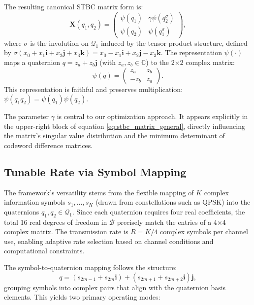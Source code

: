 \documentclass[twocolumn,conference]{IEEEtran}
\begin{document}
The resulting canonical STBC matrix form is:
\begin{equation} \label{eq:stbc_matrix_general}
\mathbf{X}(q_1, q_2) = 
\begin{pmatrix}
\psi(q_1) & \gamma \psi(q_2^{\sigma}) \\
\psi(q_2) & \psi(q_1^{\sigma})
\end{pmatrix},
\end{equation}
where $\sigma$ is the involution on $\mathcal{Q}_1$ induced by the tensor product structure, defined by $\sigma(x_0 + x_1 \mathbf{i} + x_2 \mathbf{j} + x_3 \mathbf{k}) = x_0 - x_1 \mathbf{i} + x_2 \mathbf{j} - x_3 \mathbf{k}$. The representation $\psi(\cdot)$ maps a quaternion $q = z_a + z_b \mathbf{j}$ (with $z_a, z_b \in \mathbb{C}$) to the 2×2 complex matrix:
\begin{equation}
\psi(q) = \begin{pmatrix} z_a & z_b \\ -\bar{z_b} & \bar{z_a} \end{pmatrix}.
\end{equation}
This representation is faithful and preserves multiplication: $\psi(q_1 q_2) = \psi(q_1) \psi(q_2)$.

The parameter $\gamma$ is central to our optimization approach. 
It appears explicitly in the upper-right block of equation \eqref{eq:stbc_matrix_general}, directly influencing the matrix's singular value distribution and the minimum determinant of codeword difference matrices.

\subsection{Tunable Rate via Symbol Mapping}

The framework's versatility stems from the flexible mapping of $K$ complex information symbols $s_1, \ldots, s_K$ (drawn from constellations such as QPSK) into the quaternions $q_1, q_2 \in \mathcal{Q}_1$. Since each quaternion requires four real coefficients, the total 16 real degrees of freedom in $\mathcal{B}$ precisely match the entries of a 4×4 complex matrix. The transmission rate is $R = K/4$ complex symbols per channel use, enabling adaptive rate selection based on channel conditions and computational constraints.

The symbol-to-quaternion mapping follows the structure:
\begin{equation}
q = (s_{2m-1} + s_{2m} \mathbf{i}) + (s_{2m+1} + s_{2m+2} \mathbf{i}) \mathbf{j},
\end{equation}
grouping symbols into complex pairs that align with the quaternion basis elements. This yields two primary operating modes:
\end{document}

